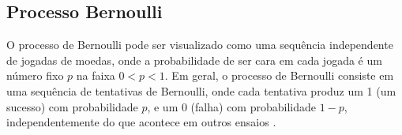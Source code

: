 











\subsection{Processo Bernoulli}

O processo de Bernoulli pode ser visualizado como uma sequência independente de jogadas de moedas, onde a probabilidade de ser cara em cada jogada é um número fixo $p$ na faixa $0 < p < 1$. Em geral, o processo de Bernoulli consiste em uma sequência de tentativas de Bernoulli, onde cada tentativa produz um 1 (um sucesso) com probabilidade $p$, e um 0 (falha) com probabilidade $1 - p$, independentemente do que acontece em outros ensaios \cite{bertsekas2008}.

